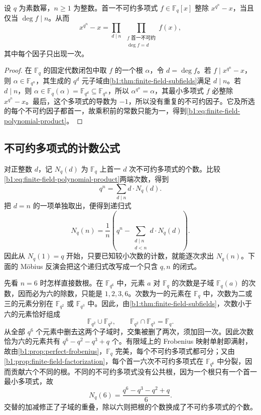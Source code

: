 \begin{proposition}\label{b1:prop:finite-field-factorization}
	设 \(q\) 为素数幂，\(n\geq1\) 为整数。首一不可约多项式 \(f\in\mathbb F_q[x]\) 整除 \(x^{q^n}-x\)，当且仅当 \(\deg f\mid n\)。从而
	\begin{equation}\label{b1:eq:finite-field-polynomial-product}
		x^{q^n}-x=\prod_{d\mid n}\ \prod_{\substack{f\text{ 首一不可约}\\\deg f=d}}f(x),
	\end{equation}
	其中每个因子只出现一次。
\end{proposition}
\begin{proof}
	在 \(\mathbb F_q\) 的固定代数闭包中取 \(f\) 的一个根 \(\alpha\)，令 \(d=\deg f\)。若 \(f\mid x^{q^n}-x\)，则 \(\alpha\in\mathbb F_{q^n}\)，其生成的 \(q^d\) 元子域由\cref{b1:thm:finite-field-subfields}满足 \(d\mid n\)。若 \(d\mid n\)，则 \(\alpha\in\mathbb F_q(\alpha)=\mathbb F_{q^d}\subseteq\mathbb F_{q^n}\)，所以 \(\alpha^{q^n}=\alpha\)，其最小多项式 \(f\) 必整除 \(x^{q^n}-x\)。最后，这个多项式的导数为 \(-1\)，所以没有重复的不可约因子。它及所选的每个不可约因子都首一，故乘积前的常数只能为一，得到\eqref{b1:eq:finite-field-polynomial-product}。
\end{proof}

\subsection{不可约多项式的计数公式}
\label{b1:subsec:1703:02}

对正整数 \(d\)，记 \(N_q(d)\) 为 \(\mathbb F_q\) 上首一 \(d\) 次不可约多项式的个数。比较\eqref{b1:eq:finite-field-polynomial-product}两端次数，得到
\[
	q^n=\sum_{d\mid n}d\cdot N_q(d).
\]
把 \(d=n\) 的一项单独取出，便得到递归式
\[
	N_q(n)=\frac1n\left(q^n-\sum_{\substack{d\mid n\\d<n}}d\cdot N_q(d)\right).
\]
因此从 \(N_q(1)=q\) 开始，只要已知较小次数的计数，就能逐次求出 \(N_q(n)\)。下面的 Möbius 反演会把这个递归式改写成一个只含 \(q,n\) 的闭式。

\ProseParagraphBreak
先看 \(n=6\) 时怎样直接数根。在 \(\mathbb F_{q^6}\) 中，元素 \(a\) 对 \(\mathbb F_q\) 的次数是子域 \(\mathbb F_q(a)\) 的次数，因而必为六的除数，只能是 \(1,2,3,6\)。次数为一的元素在 \(\mathbb F_q\) 中，次数为二或三的元素分别在 \(\mathbb F_{q^2}\) 或 \(\mathbb F_{q^3}\) 中。因此，由\cref{b1:thm:finite-field-subfields}，次数小于六的元素恰好组成
\[
	\mathbb F_{q^2}\cup\mathbb F_{q^3}, \qquad \mathbb F_{q^2}\cap\mathbb F_{q^3}=\mathbb F_q.
\]
从全部 \(q^6\) 个元素中删去这两个子域时，交集被删了两次，须加回一次。因此次数恰为六的元素共有 \(q^6-q^2-q^3+q\) 个。有限域上的 Frobenius 映射单射即满射，故由\cref{b1:prop:perfect-frobenius}，\(\mathbb F_q\) 完美，每个不可约多项式都可分；又由\cref{b1:prop:finite-field-factorization}，每个首一六次不可约多项式在 \(\mathbb F_{q^6}\) 中分裂，因而贡献六个不同的根。不同的不可约多项式没有公共根，因为一个根只有一个首一最小多项式，故
\[
	N_q(6)=\frac{q^6-q^3-q^2+q}{6}.
\]
交替的加减修正了子域的重叠，除以六则把根的个数换成了不可约多项式的个数。

